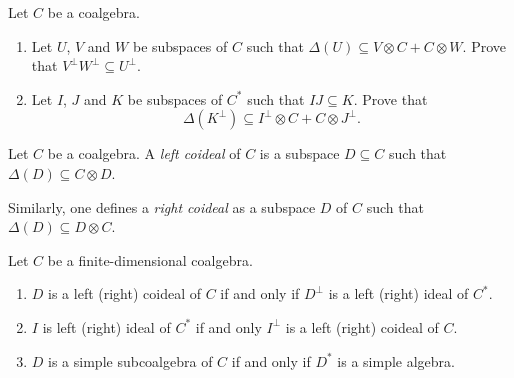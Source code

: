 \begin{exercise}
\label{xca:dual}
    Let $C$ be a coalgebra. 
    \begin{enumerate}
        \item Let $U$, $V$ and $W$ be subspaces of $C$ such that 
    $\Delta(U)\subseteq V\otimes C+C\otimes W$. Prove that 
    $V^\perp W^\perp\subseteq U^\perp$. 
    \item Let $I$, $J$ and $K$ be subspaces of $C^*$ 
    such that $IJ\subseteq K$. Prove that 
    \[
    \Delta(K^\perp)\subseteq I^\perp\otimes C+C\otimes J^\perp.
    \]
    \end{enumerate}
\end{exercise}


\begin{definition}
    Let $C$ be a coalgebra. A \emph{left coideal} of $C$ 
    is a subspace $D\subseteq C$ such that 
    $\Delta(D)\subseteq C\otimes D$. 
\end{definition}

Similarly, one defines a \emph{right coideal} as a subspace
$D$ of $C$ such that $\Delta(D)\subseteq D\otimes C$. 

\begin{lemma}
\label{lem:correspondence}
    Let $C$ be a finite-dimensional coalgebra. 
    \begin{enumerate}
        \item $D$ is a left (right) coideal of $C$ 
        if and only if $D^\perp$ is a left  (right)
        ideal of $C^*$. 
        \item $I$ is left (right) ideal of $C^*$ if and only  
        $I^\perp$ is a left (right) coideal of $C$.
        \item $D$ is a simple subcoalgebra of $C$ 
        if and only if $D^*$ is a simple algebra. 
    \end{enumerate}
\end{lemma}

